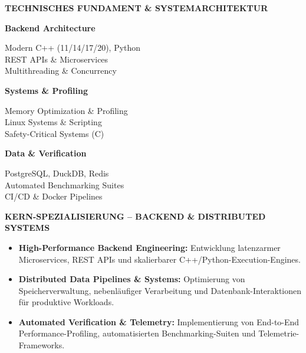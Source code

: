\documentclass[10pt,a4paper]{article}
\begin{document}
\colorbox{primary!10}{%
\parbox{\dimexpr\textwidth-2\fboxsep\relax}{%
    \vspace{0.10cm}
    \centering
    {\bfseries\color{primary} TECHNISCHES FUNDAMENT \& SYSTEMARCHITEKTUR\par}
    \vspace{0.08cm}

    \begin{minipage}[t]{0.31\linewidth}
        \raggedright
        \textbf{\color{primary}Backend Architecture}\par
        Modern C++ (11/14/17/20), Python\\
        REST APIs \& Microservices\\
        Multithreading \& Concurrency
    \end{minipage}
    \hfill
    \begin{minipage}[t]{0.31\linewidth}
        \raggedright
        \textbf{\color{primary}Systems \& Profiling}\par
        Memory Optimization \& Profiling\\
        Linux Systems \& Scripting\\
        Safety-Critical Systems (C)
    \end{minipage}
    \hfill
    \begin{minipage}[t]{0.31\linewidth}
        \raggedright
        \textbf{\color{primary}Data \& Verification}\par
        PostgreSQL, DuckDB, Redis\\
        Automated Benchmarking Suites\\
        CI/CD \& Docker Pipelines
    \end{minipage}

    \vspace{0.08cm}
}%
}

\vspace{0.15cm}

{\centering
\colorbox{accent!25}{%
\parbox{\dimexpr\textwidth-25\fboxsep\relax}{%
    \vspace{0.08cm}
    \centering
    {\bfseries\color{primary}KERN-SPEZIALISIERUNG -- BACKEND \& DISTRIBUTED SYSTEMS\par}
    \vspace{0.05cm}
    \raggedright
    \begin{itemize}[leftmargin=1.5em, itemsep=0.15em, topsep=0.15em]
        \item \textbf{\color{primary}High-Performance Backend Engineering:} Entwicklung latenzarmer Microservices, REST APIs und skalierbarer C++/Python-Execution-Engines.
        \item \textbf{\color{primary}Distributed Data Pipelines \& Systems:} Optimierung von Speicherverwaltung, nebenläufiger Verarbeitung und Datenbank-Interaktionen für produktive Workloads.
        \item \textbf{\color{primary}Automated Verification \& Telemetry:} Implementierung von End-to-End Performance-Profiling, automatisierten Benchmarking-Suiten und Telemetrie-Frameworks.
    \end{itemize}
    \vspace{0.05cm}
}%
}\par}
\end{document}
